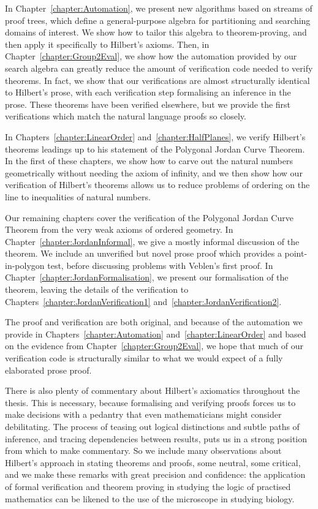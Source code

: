 In Chapter~\ref{chapter:Automation}, we present new algorithms based on streams of proof trees, which define a general-purpose algebra for partitioning and searching domains of interest. We show how to tailor this algebra to theorem-proving, and then apply it specifically to Hilbert's axioms. Then, in Chapter~\ref{chapter:Group2Eval}, we show how the automation provided by our search algebra can greatly reduce the amount of verification code needed to verify theorems. In fact, we show that our verifications are almost structurally identical to Hilbert's prose, with each verification step formalising an inference in the prose. These theorems have been verified elsewhere, but we provide the first verifications which match the natural language proofs so closely.

In Chapters~\ref{chapter:LinearOrder} and~\ref{chapter:HalfPlanes}, we verify Hilbert's theorems leadings up to his statement of the Polygonal Jordan Curve Theorem. In the first of these chapters, we show how to carve out the natural numbers geometrically without needing the axiom of infinity, and we then show how our verification of Hilbert's theorems allows us to reduce problems of ordering on the line to inequalities of natural numbers.

Our remaining chapters cover the verification of the Polygonal Jordan Curve Theorem from the very weak axioms of ordered geometry. In Chapter~\ref{chapter:JordanInformal}, we give a mostly informal discussion of the theorem. We include an unverified but novel prose proof which provides a point-in-polygon test, before discussing problems with Veblen's first proof. In Chapter~\ref{chapter:JordanFormalisation}, we present our formalisation of the theorem, leaving the details of the verification to Chapters~\ref{chapter:JordanVerification1} and~\ref{chapter:JordanVerification2}.

The proof and verification are both original, and because of the automation we provide in Chapters~\ref{chapter:Automation} and~\ref{chapter:LinearOrder} and based on the evidence from Chapter~\ref{chapter:Group2Eval}, we hope that much of our verification code is structurally similar to what we would expect of a fully elaborated prose proof.

There is also plenty of commentary about Hilbert's axiomatics throughout the thesis. This is necessary, because formalising and verifying proofs forces us to make decisions with a pedantry that even mathematicians might consider debilitating. The process of teasing out logical distinctions and subtle paths of inference, and tracing dependencies between results, puts us in a strong position from which to make commentary. So we include many observations about Hilbert's approach in stating theorems and proofs, some neutral, some critical, and we make these remarks with great precision and confidence: the application of formal verification and theorem proving in studying the logic of practised mathematics can be likened to the use of the microscope in studying biology.

